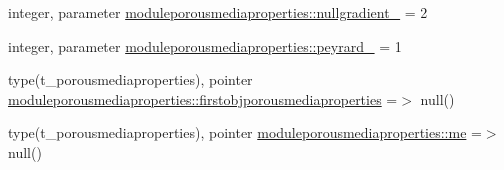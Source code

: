 \begin{DoxyCompactItemize}
integer, parameter \mbox{\hyperlink{namespacemoduleporousmediaproperties_af0684f3b7ac61f5d41e83cc1424d8fae}{moduleporousmediaproperties\+::nullgradient\+\_\+}} = 2
\item 
integer, parameter \mbox{\hyperlink{namespacemoduleporousmediaproperties_a1e67fec3a9035dcb908daca2f464ffe0}{moduleporousmediaproperties\+::peyrard\+\_\+}} = 1
\item 
type(t\+\_\+porousmediaproperties), pointer \mbox{\hyperlink{namespacemoduleporousmediaproperties_ab44e9a984567630770ebd718383594a7}{moduleporousmediaproperties\+::firstobjporousmediaproperties}} =$>$ null()
\item 
type(t\+\_\+porousmediaproperties), pointer \mbox{\hyperlink{namespacemoduleporousmediaproperties_af14bc4d911a57505bd2db9b85e475b08}{moduleporousmediaproperties\+::me}} =$>$ null()
\end{DoxyCompactItemize}
